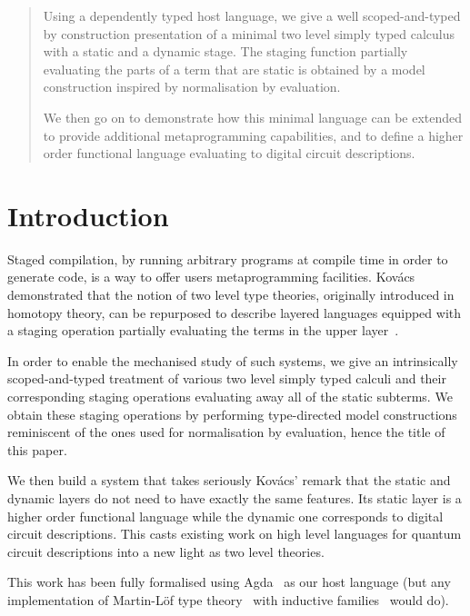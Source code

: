 \begin{abstract}
  Using a dependently typed host language, we give a well
  scoped-and-typed by construction presentation of a minimal
  two level simply typed calculus with a static and a dynamic
  stage.
  The staging function partially evaluating the parts of a term
  that are static is obtained by a model construction inspired
  by normalisation by evaluation.

  We then go on to demonstrate how this minimal language can be
  extended to provide additional metaprogramming capabilities,
  and to define a higher order functional language evaluating
  to digital circuit descriptions.
\end{abstract}

\maketitle

\section{Introduction}

Staged compilation, by running arbitrary programs at compile
time in order to generate code, is a way to offer users
metaprogramming facilities.
%
Kov{\'{a}}cs demonstrated that the notion of two level
type theories, originally introduced in homotopy theory,
can be repurposed to describe layered languages equipped
with a staging operation partially evaluating the terms
in the upper layer~\cite{DBLP:journals/pacmpl/Kovacs22}.

In order to enable the mechanised study of such systems,
we give an intrinsically scoped-and-typed treatment of
various two level simply typed calculi and their
corresponding staging operations evaluating away all of
the static subterms.
%
We obtain these staging operations by performing type-directed
model constructions reminiscent of the ones used for normalisation
by evaluation, hence the title of this paper.

We then build a system that takes seriously Kov{\'{a}}cs'
remark that the static and dynamic layers do not need to have
exactly the same features. Its static layer is a higher order
functional language while the dynamic one corresponds to
digital circuit descriptions.
%
This casts existing work on high level languages for quantum
circuit descriptions into a new light as two level theories.

This work has been fully formalised using Agda~\cite{DBLP:conf/afp/Norell08}
as our host language (but any implementation
of Martin-Löf type theory~\cite{DBLP:books/daglib/0000395}
with inductive families~\cite{DBLP:journals/fac/Dybjer94}
would do).

